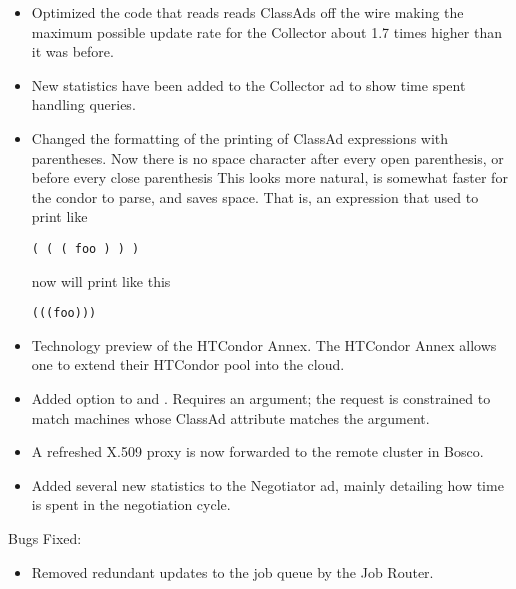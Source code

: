 \begin{itemize}

\item Optimized the code that reads reads ClassAds off the wire making the maximum possible update rate
for the Collector about 1.7 times higher than it was before.

\item New statistics have been added to the Collector ad to show time spent handling queries.

\item Changed the formatting of the printing of ClassAd expressions with
parentheses. Now there is no space character after every open parenthesis, or
before every close parenthesis
This looks more natural, is somewhat faster for the condor to parse, and
saves space.  That is, an expression that used to print like

\begin{verbatim}
( ( ( foo ) ) )
\end{verbatim}
now will print like this
\begin{verbatim}
(((foo)))
\end{verbatim}

\item Technology preview of the HTCondor Annex. The HTCondor Annex allows one
to extend their HTCondor pool into the cloud.

\item Added  option to  and .  Requires
an argument; the request is constrained to match machines whose
 ClassAd attribute matches the argument.

\item A refreshed X.509 proxy is now forwarded to the remote cluster
in Bosco.

\item Added several new statistics to the Negotiator ad, mainly
detailing how time is spent in the negotiation cycle.

\end{itemize}

\noindent Bugs Fixed:

\begin{itemize}

\item Removed redundant updates to the job queue by the Job Router.

\end{itemize}

